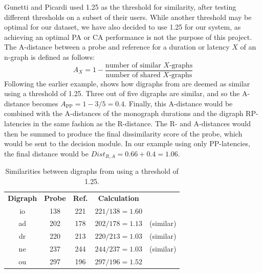 Gunetti and Picardi \cite{gnp} used 1.25 as the threshold for similarity, after testing different thresholds on a subset of their users.
While another threshold may be optimal for our dataset, we have also decided to use 1.25 for our system, as achieving an optimal PA or CA performance is not the purpose of this project.
The A-distance between a probe and reference for a duration or latency $X$ of an n-graph is defined as follows: \begin{equation*}
    A_X = 1-\frac{\text{number of similar $X$-graphs}}{\text{number of shared $X$-graphs}}
\end{equation*}
Following the earlier example,  shows how digraphs from  are deemed as similar using a threshold of 1.25.
Three out of five digraphs are similar, and so the A-distance becomes $A_\text{{PP}} = 1-3/5 = 0.4$.
Finally, this A-distance would be combined with the A-distances of the monograph durations and the digraph RP-latencies in the same fashion as the R-distance.
The R- and A-distances would then be summed to produce the final dissimilarity score of the probe, which would be sent to the decision module.
In our example using only PP-latencies, the final distance  would be $Dist_{R,A} = 0.66 + 0.4 = 1.06$.

\begin{table}[h]
\centering
\begin{tabular}{ccccl}
 \bf Digraph & \bf Probe & \bf Ref. & \bf Calculation &  \\
 io & 138 & 221 & $221/138=1.60$ &  \\
 ad & 202 & 178 & $202/178=1.13$ & (similar) \\
 dr & 220 & 213 & $220/213=1.03$ & (similar) \\
 ne & 237 & 244 & $244/237=1.03$ & (similar) \\
 ou & 297 & 196 & $297/196=1.52$ & \\
\end{tabular}
\caption{Similarities between digraphs from  using a threshold of 1.25.}
\label{tab:A-distance-similar}
\end{table}

